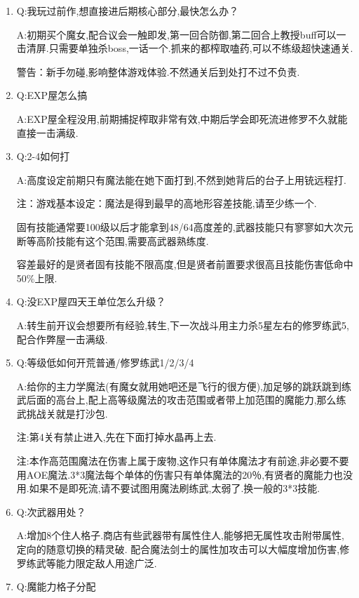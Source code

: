 \begin{enumerate}
	\item
	Q:我玩过前作,想直接进后期核心部分,最快怎么办？

	A:初期买个魔女,配合议会一触即发,第一回合防御,第二回合上教授buff可以一击清屏.只需要单独杀boss,一话一个.抓来的都榨取嗑药,可以不练级超快速通关.

	警告：新手勿碰,影响整体游戏体验.不然通关后到处打不过不负责.


	\item
	Q:EXP屋怎么搞

	A:EXP屋全程没用,前期捕捉榨取非常有效,中期后学会即死流进修罗不久就能直接一击满级.


	\item
	Q:2-4如何打

	A:高度设定前期只有魔法能在她下面打到,不然到她背后的台子上用铳远程打.

	注：游戏基本设定：魔法是得到最早的高地形容差技能,请至少练一个.

	固有技能通常要100级以后才能拿到48/64高度差的,武器技能只有寥寥如大次元断等高阶技能有这个范围,需要高武器熟练度.

	容差最好的是贤者固有技能不限高度,但是贤者前置要求很高且技能伤害低命中50\%上限.

	\item
	Q:没EXP屋四天王单位怎么升级？

	A:转生前开议会想要所有经验,转生,下一次战斗用主力杀5星左右的修罗练武5,配合作弊屋一击满级.

	\item
	Q:等级低如何开荒普通/修罗练武1/2/3/4

	A:给你的主力学魔法(有魔女就用她吧还是飞行的很方便),加足够的跳跃跳到练武后面的高台上,配上高等级魔法的攻击范围或者带上加范围的魔能力,那么练武挑战关就是打沙包.

	注:第4关有禁止进入,先在下面打掉水晶再上去.

	注:本作高范围魔法在伤害上属于废物,这作只有单体魔法才有前途,非必要不要用AOE魔法.3*3魔法每个单体的伤害只有单体魔法的20％,有贤者的魔能力也没用.如果不是即死流,请不要试图用魔法刷练武,太弱了.换一般的3*3技能.

	\item
	Q:次武器用处？

	A:增加8个住人格子.商店有些武器带有属性住人,能够把无属性攻击附带属性,定向的随意切换的精灵破.
	配合魔法剑士的属性加攻击可以大幅度增加伤害,修罗练武等能力限定敌人用途广泛.

	\item
	Q:魔能力格子分配


\end{enumerate}
